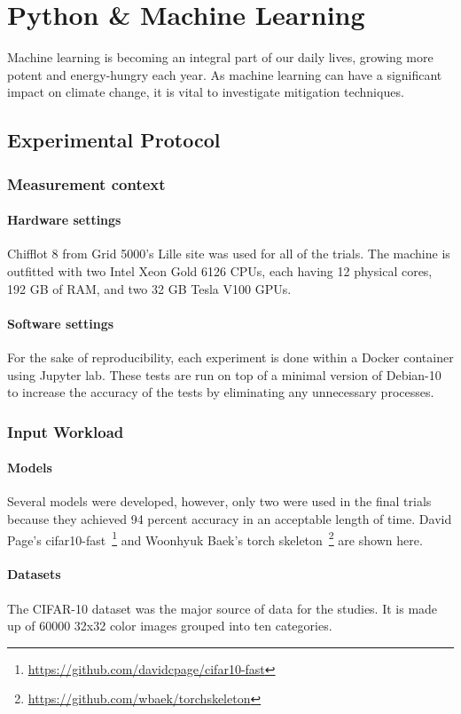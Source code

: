
\section{Python \& Machine Learning}
Machine learning is becoming an integral part of our daily lives, growing more potent and energy-hungry each year.
As machine learning can have a significant impact on climate change, it is vital to investigate mitigation techniques.
\subsection{Experimental Protocol}
\subsubsection{Measurement context}
\paragraph{Hardware settings}
Chifflot 8 from Grid 5000's Lille site was used for all of the trials.
The machine is outfitted with two Intel Xeon Gold 6126 CPUs, each having 12 physical cores, 192 GB of RAM, and two 32 GB Tesla V100 GPUs.

\paragraph{Software settings}
For the sake of reproducibility, each experiment is done within a Docker container using Jupyter lab. These tests are run on top of a minimal version of Debian-10 to increase the accuracy of the tests by eliminating any unnecessary processes.
\subsubsection{Input Workload}
\paragraph{Models}
Several models were developed, however, only two were used in the final trials because they achieved 94 percent accuracy in an acceptable length of time.
David Page's cifar10-fast~\footnote{\url{https://github.com/davidcpage/cifar10-fast}} and Woonhyuk Baek's torch skeleton~\footnote{\url{https://github.com/wbaek/torchskeleton}} are shown here.

\paragraph{Datasets}
The CIFAR-10 dataset was the major source of data for the studies.
It is made up of 60000 32x32 color images grouped into ten categories.

